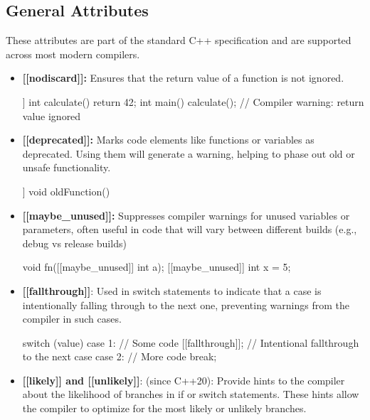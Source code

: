 \documentclass{report}
\begin{document}
    \subsection{General Attributes}
    \bigbreak \noindent 
    These attributes are part of the standard C++ specification and are supported across most modern compilers.
    \begin{itemize}
        \item \textbf{[[nodiscard]]:} Ensures that the return value of a function is not ignored.
            \bigbreak \noindent 
            \begin{cppcode}
                [[nodiscard]] int calculate() { return 42; }
                int main() {
                    calculate(); // Compiler warning: return value ignored
                }
            \end{cppcode}
        \item \textbf{[[deprecated]]:} Marks code elements like functions or variables as deprecated. Using them will generate a warning, helping to phase out old or unsafe functionality.
            \bigbreak \noindent 
            \begin{cppcode}
                [[deprecated("Use newFunction() instead")]]
                void oldFunction() {}
            \end{cppcode}
        \item \textbf{[[maybe\_unused]]:} Suppresses compiler warnings for unused variables or parameters, often useful in code that will vary between different builds (e.g., debug vs release builds)
            \begin{cppcode}
                void fn([[maybe\_unused]] int a);
                [[maybe\_unused]] int x = 5;
            \end{cppcode}
        \item \textbf{[[fallthrough]]}: Used in switch statements to indicate that a case is intentionally falling through to the next one, preventing warnings from the compiler in such cases.
            \bigbreak \noindent 
            \begin{cppcode}
                switch (value) {
                    case 1:
                        // Some code
                        [[fallthrough]];  // Intentional fallthrough to the next case
                    case 2:
                        // More code
                        break;
                }
            \end{cppcode}
        \item \textbf{[[likely]] and [[unlikely]]}: (since C++20): Provide hints to the compiler about the likelihood of branches in if or switch statements. These hints allow the compiler to optimize for the most likely or unlikely branches.

\end{itemize}
\end{document}
